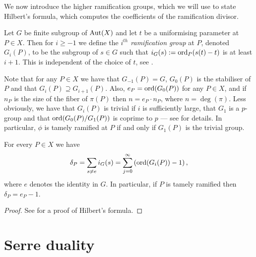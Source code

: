 We now introduce the higher ramification groups, which we will use to state Hilbert's formula, which computes the coefficients of the ramification divisor.

   \begin{defn}
    Let $G$ be finite subgroup of $\operatorname{Aut}(X)$ and let $t$ be a uniformising parameter at $P\in X$.
    Then for $i\geq -1$ we define the \emph{$i^{th}$ ramification group} at $P$, denoted $G_i(P)$, to be the subgroup of $s\in G$ such that $i_G(s) := \operatorname{ord}_P(s(t)-t)$ is at least $i+1$.
    This is	independent of the choice of $t$, see \cite[Chap. IV, \S 1, pg. 62]{localfields}.
    \end{defn}

Note that for any $P\in X$ we have that $G_{-1}(P)=G$, $G_0(P)$ is the stabiliser of $P$ and that $G_i(P)\supseteq G_{i+1}(P)$.
Also, $e_P = \operatorname{ord} (G_0(P))$ for any $P \in X$, and if $n_P$ is the size of the fiber of $\pi(P)$ then $n = e_P\cdot n_P$, where $n = \deg(\pi)$.
Less obviously, we have that $G_i(P)$ is trivial if $i$ is sufficiently large, that $G_1$ is a $p$-group and that $\operatorname{ord}(G_0(P)/G_1(P))$ is coprime to $p$ ---  see \cite[Chap. IV, \S 1]{localfields} for details.
In particular, $\phi$ is tamely ramified at $P$ if and only if $G_1(P)$ is the trivial group.



    \begin{thm}\label{hilbertsformula}
    For every $P\in X$ we have
        \begin{equation*}
        \delta_P = \sum_{s\neq e}i_G(s)=\sum_{j=0}^{\infty}\left(\operatorname{ord}(G_i(P))-1\right),\label{ramdiv}
        \end{equation*}
    where $e$ denotes the identity in $G$.
    In particular, if $P$ is tamely ramified then $\delta_P = e_P -1$.
    \end{thm}
    \begin{proof}
    See \cite[Chap. IV, \S 1, Prop. 4]{localfields} for a proof of Hilbert's formula.
    \end{proof}

 
\section{Serre duality}

